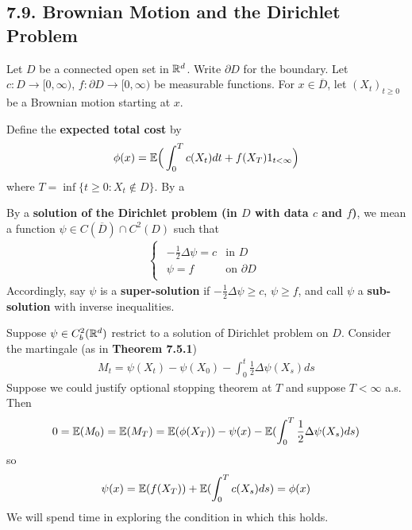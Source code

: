 \documentclass[12pt,a4paper]{report}
\begin{document}
\subsection*{7.9. Brownian Motion and the Dirichlet Problem}

Let $D$ be a connected open set in $\mathbb{R}^d$. Write $\partial D$ for the boundary. Let $c: D \rightarrow [0,\infty)$, $f: \partial D \rightarrow [0,\infty)$ be measurable functions. For $x\in \overline{D}$, let $(X_t)_{t\geq 0}$ be a Brownian motion starting at $x$.

\quad Define the \textbf{expected total cost} by
\begin{align*}
\phi(x) = \mathbb{E} \Big( \int_0^T c(X_t) dt + f(X_T) 1_{t< \infty} \Big)
\end{align*}
where $T = \inf \{ t\geq 0 : X_t \not\in D \}$. By a

\quad By a \textbf{solution of the Dirichlet problem (in $D$ with data $c$ and $f$)}, we mean a function $\psi \in C(\overline{D}) \cap C^2 (D)$ such that
\begin{align*}
\begin{cases}
\begin{array}{ll}
-\frac{1}{2} \Delta \psi = c & \text{in } D \\
\psi = f & \text{on } \partial D
\end{array}
\end{cases}
\end{align*}
Accordingly, say $\psi$ is a \textbf{super-solution} if $-\frac{1}{2} \Delta \psi \geq c$, $\psi \geq f$, and call $\psi$ a \textbf{sub-solution} with inverse inequalities.

\quad Suppose $\psi \in C_b^2(\mathbb{R}^d)$ restrict to a solution of Dirichlet problem on $D$. Consider the martingale (as in \textbf{Theorem 7.5.1})
\begin{align*}
M_t = \psi(X_t) - \psi(X_0) - \int_0^t \frac{1}{2} \Delta \psi (X_s) ds
\end{align*}
Suppose we could justify optional stopping theorem at $T$ and suppose $T< \infty $ a.s. Then
\begin{align*}
0 = \mathbb{E}(M_0) = \mathbb{E}(M_T) = \mathbb{E}(\phi(X_T)) - \psi(x) - \mathbb{E}(\int_0^T \frac{1}{2} \Delta \psi(X_s) ds)
\end{align*} 
so 
\begin{align*}
\psi(x) = \mathbb{E}(f(X_T)) + \mathbb{E}(\int_0^T c(X_s) ds) = \phi(x)
\end{align*}
We will spend time in exploring the condition in which this holds.
\s
\end{document}
